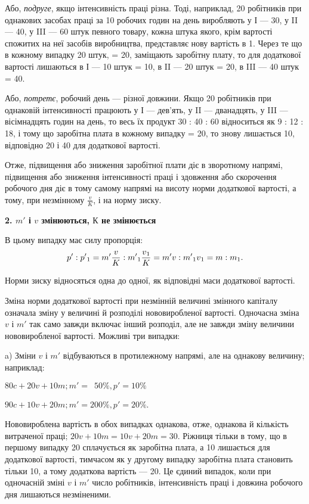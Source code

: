 Або, \emph{подруге}, якщо інтенсивність праці різна. Тоді, наприклад,
20 робітників при однакових засобах праці за 10 робочих
годин на день виробляють у І — 30, у II — 40, у III — 60 штук
певного товару, кожна штука якого, крім вартості спожитих
на неї засобів виробництва, представляє нову вартість в 1. Через те що в кожному випадку 20 штук, = 20, заміщають заробітну плату, то для додаткової
вартості лишаються в І — 10 штук = 10,
в II — 20 штук = 20, в III — 40 штук = 40.

Або, \emph{потретє}, робочий день — різної довжини. Якщо 20 робітників
при однаковій інтенсивності працюють у І — дев’ять,
у II — дванадцять, у III — вісімнадцять годин на день, то весь їх
продукт 30 : 40 : 60 відноситься як 9 : 12 : 18, і тому що заробітна
плата в кожному випадку = 20, то знову лишається 10, відповідно
20 і 40 для додаткової вартості.

Отже, підвищення або зниження заробітної плати діє в зворотному
напрямі, підвищення або зниження інтенсивності праці
і здовження або скорочення робочого дня діє в тому самому
напрямі на висоту норми додаткової вартості, а тому, при незмінному
$\frac{v}{K}$, і на норму зиску.

\begin{center}
\textbf{2. $m'$ і $v$ змінюються, $К$ не змінюється}
\end{center}
В цьому випадку має силу пропорція:\[
p': p'\textsubscript{1} = m' \frac{v}{K} : m'\textsubscript{1} \frac{v\textsubscript{1}}{K} = m'v : m'\textsubscript{1}v\textsubscript{1} = m : m\textsubscript{1}.\]

Норми зиску відносяться одна до одної, як відповідні маси
додаткової вартості.

Зміна норми додаткової вартості при незмінній величині змінного
капіталу означала зміну у величині й розподілі нововиробленої
вартості. Одночасна зміна $v$ і $m'$ так само завжди включає
інший розподіл, але не завжди зміну величини нововиробленої
вартості. Можливі три випадки:

a) Зміни $v$ і $m'$ відбуваються в протилежному напрямі, але
на однакову величину; наприклад:
\begin{center}
$80 c + 20 v + 10 m; m' = \phantom{0}50\%, p' = 10\%$

$90 c + 10 v + 20 m; m' = 200\%, p' = 20\%$.
\end{center}
Нововироблена вартість в обох випадках однакова, отже, однакова
й кількість витраченої праці; $20 v + 10 m = 10 v + 20 m = 30$.
Ріжниця тільки в тому, що в першому випадку 20 сплачується
як заробітна плата, а 10 лишається для додаткової вартості,
тимчасом як у другому випадку заробітна плата становить
тільки 10, а тому додаткова вартість — 20. Це єдиний випадок,
коли при одночасній зміні $v$ і $m'$ число робітників, інтенсивність
праці і довжина робочого дня лишаються незміненими.

